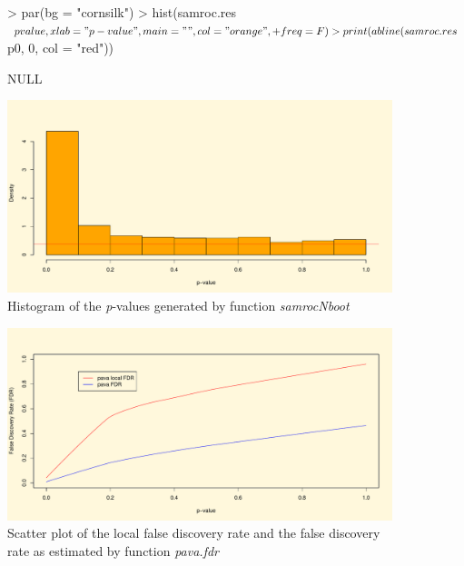 \documentclass[a4paper]{article}
\begin{document}
\begin{figure}[htbp]
\centering

\begin{Schunk}
\begin{Sinput}
> par(bg = "cornsilk")
> hist(samroc.res$pvalue, xlab = "p-value", main = "", col = "orange",
+     freq = F)
> print(abline(samroc.res$p0, 0, col = "red"))
\end{Sinput}
\begin{Soutput}
NULL
\end{Soutput}
\end{Schunk}
\includegraphics{samroc-ex-002}
\caption{Histogram of the \textit{p}-values generated by function \textit{samrocNboot}}
\label{hist1}
\end{figure}

\begin{figure}[htbp]
\centering
\begin{Schunk}
\end{Schunk}
\includegraphics{samroc-ex-003}
\caption{Scatter plot of the local false discovery rate and the false discovery rate as estimated by function \textit{pava.fdr}}
\label{hist2}
\end{figure}

\newpage


\end{document}
